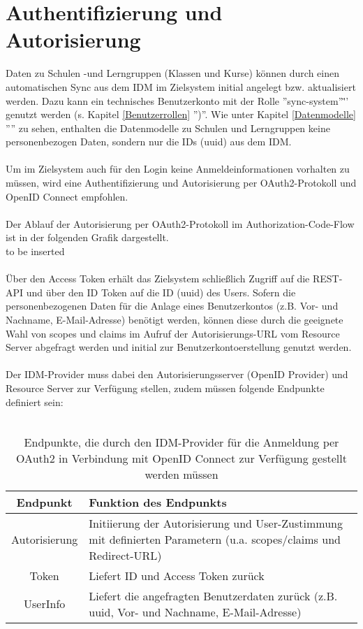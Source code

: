 \chapter{Authentifizierung und Autorisierung}
Daten zu Schulen -und Lerngruppen (Klassen und Kurse) können durch einen automatischen Sync aus dem IDM im Zielsystem initial angelegt bzw. aktualisiert werden. 
Dazu kann ein technisches Benutzerkonto mit der Rolle ''sync-system''\"'' genutzt werden (s. Kapitel \ref{Benutzerrollen} '')''.
Wie unter Kapitel \ref{Datenmodelle} '''' zu sehen, enthalten die Datenmodelle zu Schulen und Lerngruppen keine personenbezogen Daten, sondern nur die IDs (uuid) aus dem IDM. \\
\\
Um im Zielsystem auch für den Login keine Anmeldeinformationen vorhalten zu müssen, wird eine Authentifizierung und Autorisierung per OAuth2-Protokoll und OpenID Connect empfohlen.\\
\\
Der Ablauf der Autorisierung per OAuth2-Protokoll im Authorization-Code-Flow ist in der folgenden Grafik dargestellt. 
\\
to be inserted\\
\\
Über den Access Token erhält das Zielsystem schließlich Zugriff auf die REST-API und über den ID Token auf die ID (uuid) des Users. 
Sofern die personenbezogenen Daten für die Anlage eines Benutzerkontos (z.B. Vor- und Nachname, E-Mail-Adresse) benötigt werden, können diese durch die geeignete Wahl von scopes und claims im Aufruf der Autorisierungs-URL vom Resource Server abgefragt werden und initial zur Benutzerkontoerstellung genutzt werden.\\
\\
Der IDM-Provider muss dabei den Autorisierungsserver (OpenID Provider) und Resource Server zur Verfügung stellen, zudem müssen folgende Endpunkte definiert sein:\\
\\
\begin{table}[htb]
    \begin{tabularx}{\textwidth}{|c|X|}
        \hline
\textbf{Endpunkt} & \textbf{Funktion des Endpunkts} \\ \hline
Autorisierung & Initiierung der Autorisierung und User-Zustimmung mit definierten Parametern (u.a. scopes/claims und Redirect-URL) \\ \hline
Token & Liefert ID und Access Token zurück \\ \hline
UserInfo & Liefert die angefragten Benutzerdaten zurück (z.B. uuid, Vor- und Nachname, E-Mail-Adresse) \\ \hline
    \end{tabularx}

        \caption{Endpunkte, die durch den IDM-Provider für die Anmeldung per OAuth2 in Verbindung mit OpenID Connect zur Verfügung gestellt werden müssen}
        \label{tab:auth:endpoints}
\end{table}
